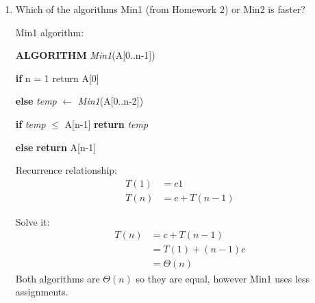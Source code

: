 \documentclass[11pts]{report}
\begin{document}
\begin{enumerate}
\begin{enumerate}
\item Which of the algorithms Min1 (from Homework 2) or Min2 is faster?

\par Min1 algorithm:
\par \textbf{ALGORITHM} \textit{Min1}(A[0..n-1])
\par \textbf{if} n = 1 return A[0]  
\par\textbf{else} \textit{temp} $\gets$ \textit{Min1}(A[0..n-2])  \quad  [c2 + T(n-1)]
\par \quad \quad \textbf{if} \textit{temp} $\leq$ A[n-1] \textbf{return} \textit{temp} 
\par \quad  \quad \textbf{else} \textbf{return} A[n-1] 
\par Recurrence relationship:
\begin{align*}
T(1) &= c1 \\
T(n) &= c + T(n-1)
\end{align*}

Solve it:
\begin{align*}
T(n) &= c + T(n-1) \\
     &= T(1) + (n-1)c \\
     &= \Theta(n)
\end{align*}
Both algorithms are $\Theta(n)$ so they are equal, however Min1 uses less assignments.


\end{enumerate}

\end{enumerate}
\end{document}
